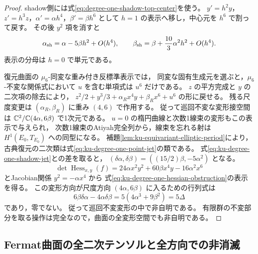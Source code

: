 \begin{proof}
shadow側には式\eqref{eq:degree-one-shadow-top-center}を使う。
$y'=h^2y$，$z'=h^3z$，$\alpha'=\alpha h^4$，$\beta'=\beta h^6$ として
$h=1$ の表示へ移し，中心元を $h^6$ で割って戻す。
その後 $y^2$ 項を消すと
\begin{equation}\label{eq:ku-degree-one-shadow-jet}
 \alpha_{\rm sh}=\alpha-5\beta h^2+O(h^4),\qquad
 \beta_{\rm sh}=\beta+\frac{10}{3}\alpha^2h^2+O(h^4).
\end{equation}
表示の分母は $h=0$ で単元である。

復元曲面の $\mu_6$-同変な重み付き反標準表示では，
同変な固有生成元を選ぶと，$\mu_6$-不変な関係式において
$u$ を含む単項式は $u^6$ だけである。
$z$ の平方完成と $y$ の二次項の除去により，
$z^2/2+y^3/3+\alpha_Rx^4y+\beta_Rx^6+u^6$ の形に戻せる。
残る尺度変更は $(\alpha_R,\beta_R)$ に重み $(4,6)$ で作用する。
従って巡回不変な変形接空間は
$\mathbb C^2/\mathbb C(4\alpha,6\beta)$ で1次元である。
$u=0$ の楕円曲線と次数1線束の変形もこの表示で与えられ，
次数1線束のAtiyah完全列から，線束を忘れる射は
$H^1(E_0,T_{E_0})$ への同型になる。
補題\ref{lem:ku-equivariant-elliptic-period}により，
古典復元の二次類は式\eqref{eq:ku-degree-one-point-jet}の類である。
式\eqref{eq:ku-degree-one-shadow-jet}との差を取ると，
$(\delta\alpha,\delta\beta)=((15/2)\beta,-5\alpha^2)$ となる。
\[
 \det\operatorname{Hess}_{x,y}(f)
 =24\alpha x^2y^2+60\beta x^4y-16\alpha^2x^6
\]
とJacobian関係 $y^2=-\alpha x^4$ から
式\eqref{eq:ku-degree-one-hessian-obstruction}の表示を得る。
この変形方向が尺度方向 $(4\alpha,6\beta)$ に入るための行列式は
\[
 6\beta\delta\alpha-4\alpha\delta\beta
   =5(4\alpha^3+9\beta^2)=5\Delta
\]
であり，零でない。
従って巡回不変変形の中で非自明である。
有限群の不変部分を取る操作は完全なので，曲面の全変形空間でも非自明である。
\end{proof}

\subsection{Fermat曲面の全二次テンソルと全方向での非消滅}

